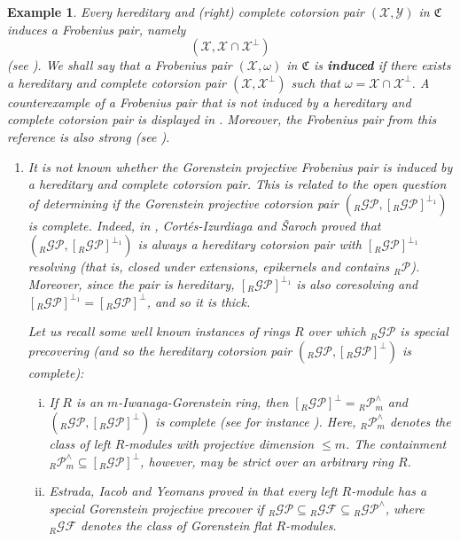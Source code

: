 \documentclass[10pt,reqno]{amsart}
\numberwithin{equation}{section}
\newtheorem{example}[definition]{Example}
\theoremstyle{remark}
\newcommand{\X}{\mathcal{X}}
\newcommand{\Y}{\mathcal{Y}}
\begin{document}
\begin{example}\label{ex:GP}
Every hereditary and (right) complete cotorsion pair $(\X,\Y)$ in $\mathfrak{C}$ induces a Frobenius pair, namely $$(\X,\X \cap \X^\perp)$$ (see \cite[Prop. 2.5]{LiangYangConstructions}). We shall say that a Frobenius pair $(\X,\omega)$ in $\mathfrak{C}$ is \textbf{induced} if there exists a hereditary and complete cotorsion pair $(\X,\X^\perp)$ such that $\omega = \X \cap \X^\perp$. A counterexample of a Frobenius pair that is not induced by a hereditary and complete cotorsion pair is displayed in \cite[Ex. 2.13]{LiangMaYang-contraejemplo}. Moreover, the Frobenius pair from this reference is also strong (see \cite[Ex. 3.12]{HMP-cut}).
\begin{enumerate}[(1)]
\item It is not known whether the Gorenstein projective Frobenius pair is induced by a hereditary and complete cotorsion pair. This is related to the open question of determining if the Gorenstein projective cotorsion pair $({}_R\mathcal{GP},[{}_R\mathcal{GP}]^{\perp_1})$ is complete. Indeed, in \cite[Coroll. 3.4]{Cortes}, Cort\'es-Izurdiaga and \v{S}aroch proved that $({}_R\mathcal{GP},[{}_R\mathcal{GP}]^{\perp_1})$ is always a hereditary cotorsion pair with $[{}_R\mathcal{GP}]^{\perp_1}$ resolving (that is, closed under extensions, epikernels and contains ${}_R\mathcal{P}$). Moreover, since the pair is hereditary, $[{}_R\mathcal{GP}]^{\perp_1}$ is also coresolving and $[{}_R\mathcal{GP}]^{\perp_1} = [{}_R\mathcal{GP}]^{\perp}$, and so it is thick. 

Let us recall some well known instances of rings $R$ over which ${}_R\mathcal{GP}$ is special precovering (and so the hereditary cotorsion pair $({}_R\mathcal{GP},[{}_R\mathcal{GP}]^{\perp})$ is complete):
\begin{enumerate}[(i)]
\item If $R$ is an $m$-Iwanaga-Gorenstein ring, then $[{}_R\mathcal{GP}]^\perp = {}_R\mathcal{P}^\wedge_m$ and $({}_R\mathcal{GP},[{}_R\mathcal{GP}]^\perp)$ is complete (see for instance \cite[Thm. 8.3]{Hov02}). Here, ${}_R\mathcal{P}^\wedge_m$ denotes the class of left $R$-modules with projective dimension $\leq m$. The containment ${}_R\mathcal{P}^\wedge_m \subseteq [{}_R\mathcal{GP}]^{\perp}$, however, may be strict over an arbitrary ring $R$.

\item Estrada, Iacob and Yeomans proved in \cite[Thm. 1]{EIY17} that every left $R$-module has a special Gorenstein projective precover if ${}_R\mathcal{GP} \subseteq {}_R\mathcal{GF} \subseteq {}_R\mathcal{GP}^\wedge$, where ${}_R\mathcal{GF}$ denotes the class of Gorenstein flat $R$-modules. 


\end{enumerate}
\end{enumerate}
\end{example}
\end{document}
